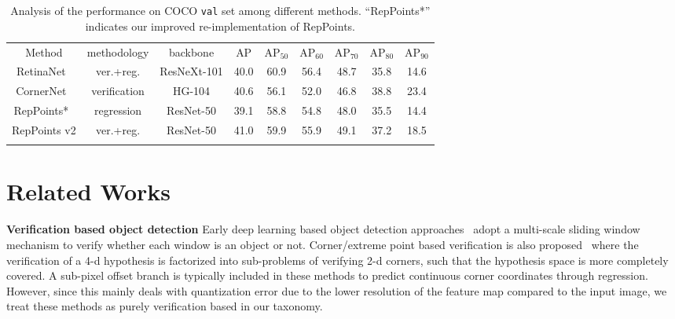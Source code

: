 \documentclass{article}
\begin{document}
\begin{table}[ht]
  \caption{Analysis of the performance on COCO \texttt{val} set among different methods. ``RepPoints*'' indicates our improved re-implementation of RepPoints.}
  \small
  \label{tab:compare}
  \centering
  \begin{tabular}{c|c|c|cccccc}
    \Xhline{1.0pt}
    Method & methodology & backbone & AP & $\text{AP}_\text{50}$ & $\text{AP}_\text{60}$ & $\text{AP}_\text{70}$ & $\text{AP}_\text{80}$ & $\text{AP}_\text{90}$ \\
    \Xhline{1.0pt}
    RetinaNet~\cite{RetinaNet} & ver.+reg. & ResNeXt-101 & 40.0 & 60.9 & 56.4 & 48.7 & 35.8 & 14.6\\
    \hline
    CornerNet~\cite{CornerNet} & verification & HG-104 & 40.6 & 56.1 & 52.0 & 46.8 & 38.8 & 23.4 \\
    \hline
    RepPoints*~\cite{yang19reppts} & regression & ResNet-50 & 39.1 & 58.8 & 54.8 & 48.0 & 35.5 & 14.4 \\    
    \Xhline{1.0pt}
    RepPoints v2 & ver.+reg. & ResNet-50 & 41.0 & 59.9 & 55.9 & 49.1 & 37.2 & 18.5 \\
    \Xhline{1.0pt}
  \end{tabular}
\end{table}


\section{Related Works}
\textbf{Verification based object detection}
Early deep learning based object detection approaches~\cite{szegedy2013deep,sermanet2014overfeat} adopt a multi-scale sliding window mechanism to  verify whether each window is an object or not. Corner/extreme point based verification is also proposed~\cite{Denet,CornerNet,ExtremeNet,duan19center} where the verification of a 4-d hypothesis is factorized into sub-problems of verifying 2-d corners, such that the hypothesis space is more completely covered. A sub-pixel offset branch is typically included in these methods to predict continuous corner coordinates through regression. However, since this mainly deals with quantization error due to the lower resolution of the feature map compared to the input image, we treat these methods as purely verification based in our taxonomy.
\end{document}
